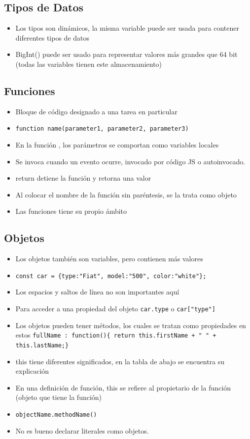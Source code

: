 \documentclass{article}
\begin{document}
 \subsection{Tipos de Datos}

 \begin{itemize}
   \item Los tipos son dinámicos, la misma variable puede ser usada para contener diferentes tipos de datos
   \item BigInt() puede ser usado para representar valores más grandes que 64 bit (todas las variables tienen este almacenamiento)
 \end{itemize}

 \subsection{Funciones}

 \begin{itemize}
   \item Bloque de código designado a una tarea en particular
   \item \lstinline{function name(parameter1, parameter2, parameter3)}
   \item En la función , los parámetros  se comportan como variables locales
   \item Se invoca cuando un evento ocurre, invocado por código JS o autoinvocado.
 \item return detiene la función y retorna una valor
 \item Al colocar el nombre de la función sin paréntesis, se la trata como objeto
 \item Las funciones tiene su propio ámbito
 \end{itemize}

 \subsection{Objetos}

 \begin{itemize}
   \item Los objetos también son variables, pero contienen más valores
   \item \lstinline|const car = {type:"Fiat", model:"500", color:"white"};|
   \item Los espacios y saltos de línea no son importantes aquí
   \item Para acceder a una propiedad del objeto \lstinline{car.type} o \lstinline{car["type"]}
   \item Los objetos pueden tener métodos, los cuales se tratan como propiedades en estos \lstinline|fullName : function(){ return this.firstName + " " + this.lastName;}|
   \item this tiene diferentes significados, en la tabla de abajo se encuentra su explicación
   \item En una definición de función, this se refiere al propietario de la función (objeto que tiene la función)
   \item \lstinline{objectName.methodName()}
   \item No es bueno declarar literales como objetos.
 \end{itemize}
\end{document}
